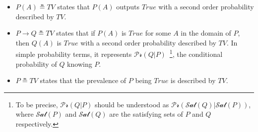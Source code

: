 \documentclass[runningheads]{llncs}
\newcommand{\SP}{\;\;\;}
\newcommand{\TTrue}{\textit{True}}
\newcommand{\TEval}{\textit{Evaluation}}
\newcommand{\TLamb}{\textit{Lambda}}
\newcommand{\TImpl}{\textit{Implication}}
\newcommand{\TTV}{\textit{TV}}
\newcommand{\TBTV}{\langle \TTV \rangle}
\newcommand{\sat}{\mathcal{Sat}}
\newcommand{\prob}{\mathcal{Pr}}
\newcommand{\limp}{\rightarrow}
\begin{document}
\begin{itemize}
\item $P(A) \measeq \TTV$ states that $P(A)$ outputs $\TTrue$ with a
  second order probability described by $\TTV$.
\item
  $P \limp Q \measeq \TTV$ states that if $P(A)$ is $\TTrue$ for some
  $A$ in the domain of $P$, then $Q(A)$ is $\TTrue$ with a second
  order probability described by $\TTV$.  In simple probability terms,
  it represents $\prob(Q|P)$~\footnote{To be precise, $\prob(Q|P)$
    should be understood as $\prob(\sat(Q)|\sat(P))$, where $\sat(P)$
    and $\sat(Q)$ are the satisfying sets of $P$ and $Q$
    respectively.}, the conditional probability of $Q$ knowing $P$.
\item $P \measeq \TTV$ states that the prevalence of $P$ being
  $\TTrue$ is described by $\TTV$.
\end{itemize}
\end{document}
